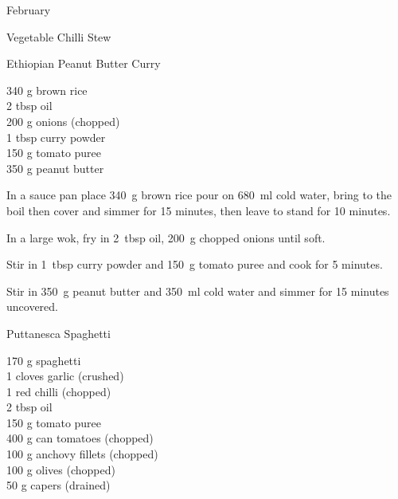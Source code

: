 \begin{menu}{February}
\begin{recipe}{2}{Vegetable Chilli Stew}
\begin{instructions}
    \end{instructions}
    \end{recipe}%
  
    \begin{recipe}{2}{Ethiopian Peanut Butter Curry}%
		\begin{ingredients}
		340 g brown rice  \\
	2 tbsp oil  \\
	200 g onions (chopped) \\
	1 tbsp curry powder  \\
	150 g tomato puree  \\
	350 g peanut butter  \\
	
		\end{ingredients}
	
	
	
    \begin{instructions}
    \item 
    In a
    sauce pan
    place
    340~g  brown rice
    pour on
    680~ml  cold water,
    bring to the boil then cover and simmer for 15 minutes,
    then leave to stand for 10 minutes.
  \item 
        In a large wok,
        fry in 2~tbsp  oil,
        200~g chopped onions
        until soft.
      \item 
        Stir in
        1~tbsp  curry powder
        and
        150~g  tomato puree
        and cook for 5 minutes.
      \item 
        Stir in
        350~g  peanut butter
        and
        350~ml  cold water
        and simmer for 15 minutes uncovered.
      
    \end{instructions}
    \end{recipe}%
  
    \begin{recipe}{1}{Puttanesca Spaghetti}%
		\begin{ingredients}
		170 g spaghetti  \\
	1 cloves garlic (crushed) \\
	1  red chilli (chopped) \\
	2 tbsp oil  \\
	150 g tomato puree  \\
	400 g can tomatoes (chopped) \\
	100 g anchovy fillets (chopped) \\
	100 g olives (chopped) \\
	50 g capers (drained) \\
	

\end{ingredients}
\end{recipe}
\end{menu}
